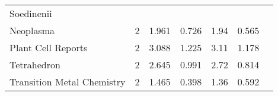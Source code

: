\begin{longtable}[c]{lcccrcc}
 Soedinenii                                                                         &        &         &       &            &                       \\[0.5ex]
 Neoplasma                                                                          & 2      & 1.961   & 0.726 &  1.94      & 0.565                 \\[0.5ex]
 Plant Cell Reports                                                                 & 2      & 3.088   & 1.225 &  3.11      & 1.178                 \\[0.5ex]
 Tetrahedron                                                                        & 2      & 2.645   & 0.991 &  2.72      & 0.814                 \\[0.5ex]
 Transition Metal Chemistry                                                         & 2      & 1.465   & 0.398 &  1.36      & 0.592                 \\[0.5ex]
\end{longtable}




